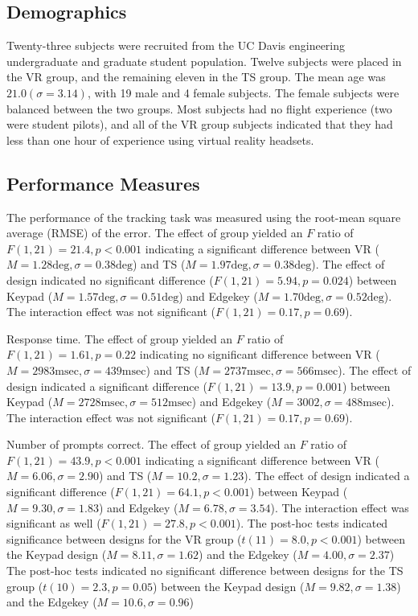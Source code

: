 \subsection{Demographics}

Twenty-three subjects were recruited from the UC Davis engineering undergraduate and graduate student population.
Twelve subjects were placed in the VR group, and the remaining eleven in the TS group.
The mean age was $21.0 (\sigma = 3.14)$, with 19 male and 4 female subjects.
The female subjects were balanced between the two groups.
Most subjects had no flight experience (two were student pilots), and all of the VR group subjects indicated that they had less than one hour of experience using virtual reality headsets.

\subsection{Performance Measures}

The performance of the tracking task was measured using the root-mean square average (RMSE) of the error.
The effect of group yielded an $F$ ratio of $F(1, 21) = 21.4, p < 0.001$ indicating a significant difference between VR ($M=1.28\mathrm{deg}, \sigma=0.38\mathrm{deg}$) and TS ($M=1.97\mathrm{deg}, \sigma=0.38\mathrm{deg}$).
The effect of design indicated no significant difference ($F(1, 21) = 5.94, p=0.024$) between Keypad ($M=1.57\mathrm{deg}, \sigma=0.51\mathrm{deg}$) and Edgekey ($M=1.70\mathrm{deg}, \sigma=0.52\mathrm{deg}$).
The interaction effect was not significant ($F(1, 21) = 0.17, p=0.69$).

Response time.
The effect of group yielded an $F$ ratio of $F(1, 21) = 1.61, p = 0.22$ indicating no significant difference between VR ($M = 2983\mathrm{msec}, \sigma = 439\mathrm{msec}$) and TS ($M = 2737\mathrm{msec}, \sigma = 566\mathrm{msec}$).
The effect of design indicated a significant difference ($F(1, 21) = 13.9, p = 0.001$) between Keypad ($M=2728\mathrm{msec}, \sigma=512\mathrm{msec}$) and Edgekey ($M=3002, \sigma=488\mathrm{msec}$).
The interaction effect was not significant ($F(1, 21) = 0.17, p = 0.69$).

Number of prompts correct.
The effect of group yielded an $F$ ratio of $F(1, 21) = 43.9, p < 0.001$ indicating a significant difference between VR ($M = 6.06, \sigma = 2.90$) and TS ($M = 10.2, \sigma = 1.23$).
The effect of design indicated a significant difference ($F(1, 21) = 64.1, p < 0.001$) between Keypad ($M = 9.30, \sigma=1.83$) and Edgekey ($M=6.78, \sigma=3.54$).
The interaction effect was significant as well ($F(1, 21) = 27.8, p < 0.001$).
The post-hoc tests indicated significance between designs for the VR group ($t(11) = 8.0, p < 0.001$) between the Keypad design ($M = 8.11, \sigma = 1.62$) and the Edgekey ($M = 4.00, \sigma = 2.37$)
The post-hoc tests indicated no significant difference between designs for the TS group ($t(10) = 2.3, p = 0.05$) between the Keypad design ($M = 9.82, \sigma = 1.38$) and the Edgekey ($M = 10.6, \sigma = 0.96$)

